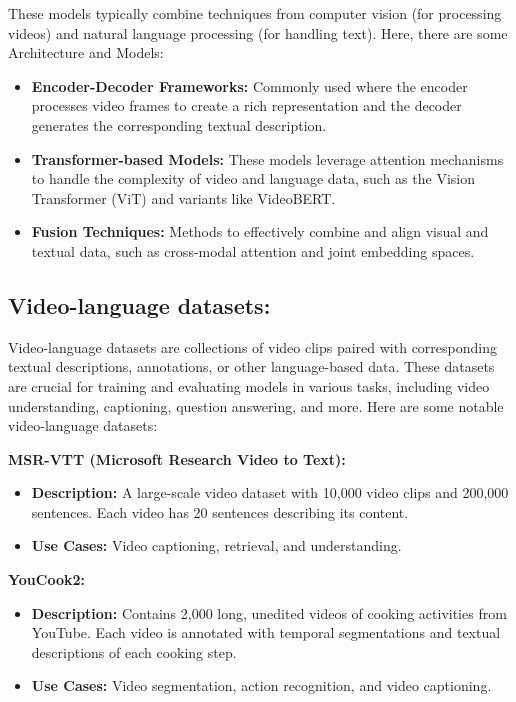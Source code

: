 \noindent These models typically combine techniques from computer vision (for processing videos) and natural language processing (for handling text). Here, there are some Architecture and Models:

\begin{itemize}
\item \textbf{Encoder-Decoder Frameworks:} Commonly used where the encoder processes video frames to create a rich representation and the decoder generates the corresponding textual description.
\item \textbf{Transformer-based Models:} These models leverage attention mechanisms to handle the complexity of video and language data, such as the Vision Transformer (ViT) and variants like VideoBERT.
\item \textbf{Fusion Techniques:} Methods to effectively combine and align visual and textual data, such as cross-modal attention and joint embedding spaces.
\end{itemize}
\subsection{Video-language datasets:}
Video-language datasets are collections of video clips paired with corresponding textual descriptions, annotations, or other language-based data. These datasets are crucial for training and evaluating models in various tasks, including video understanding, captioning, question answering, and more. Here are some notable video-language datasets:

\textbf{MSR-VTT (Microsoft Research Video to Text):}
\begin{itemize}
\item \textbf{Description:} A large-scale video dataset with 10,000 video clips and 200,000 sentences. Each video has 20 sentences describing its content.
\item \textbf{Use Cases:} Video captioning, retrieval, and understanding.
\end{itemize}

\textbf{YouCook2:}
\begin{itemize}
\item \textbf{Description:} Contains 2,000 long, unedited videos of cooking activities from YouTube. Each video is annotated with temporal segmentations and textual descriptions of each cooking step.
\item \textbf{Use Cases:} Video segmentation, action recognition, and video captioning.
\end{itemize}

